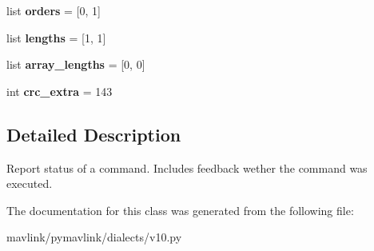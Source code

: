 \begin{DoxyCompactItemize}
\item 
\mbox{\label{classpymavlink_1_1dialects_1_1v10_1_1MAVLink__command__ack__message_a6627f01af6413e6505ec07574de7c46a}} 
list {\bfseries orders} = \mbox{[}0, 1\mbox{]}
\item 
\mbox{\label{classpymavlink_1_1dialects_1_1v10_1_1MAVLink__command__ack__message_a620d931022e0ee9ec8fba3366d6005bf}} 
list {\bfseries lengths} = \mbox{[}1, 1\mbox{]}
\item 
\mbox{\label{classpymavlink_1_1dialects_1_1v10_1_1MAVLink__command__ack__message_a59f220d2230ef5996bd5b0b961b9d56d}} 
list {\bfseries array\+\_\+lengths} = \mbox{[}0, 0\mbox{]}
\item 
\mbox{\label{classpymavlink_1_1dialects_1_1v10_1_1MAVLink__command__ack__message_a1dcb3ecada75ac25441248d186170d80}} 
int {\bfseries crc\+\_\+extra} = 143
\end{DoxyCompactItemize}


\subsection{Detailed Description}
\begin{DoxyVerb}Report status of a command. Includes feedback wether the
command was executed.
\end{DoxyVerb}
 

The documentation for this class was generated from the following file\+:\begin{DoxyCompactItemize}
\item 
mavlink/pymavlink/dialects/v10.\+py\end{DoxyCompactItemize}
